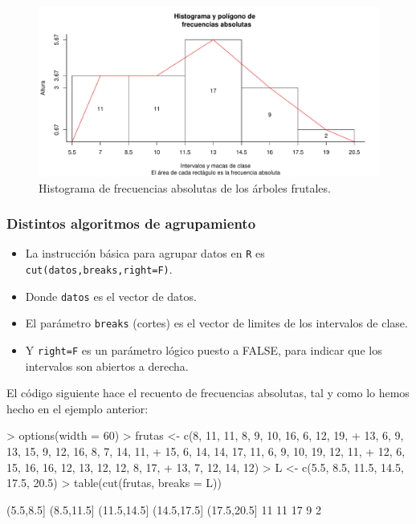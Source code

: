 \begin{frame}
\begin{figure}
\begin{center}


\includegraphics{./dibujos/01/-007}
\end{center}
 \caption{Histograma de frecuencias absolutas de los árboles frutales.} \label{EXEMPLE2}
\end{figure}
\label{PUNTUACIONS}
\end{frame}

\begin{frame}[fragile]
\frametitle{Distintos algoritmos de agrupamiento}
\begin{itemize}
\item La instrucción básica para agrupar datos en \texttt{R} es \texttt{cut(datos,breaks,right=F)}.
\item  Donde \texttt{datos} es el vector de datos.
\item El parámetro \texttt{breaks} (cortes) es el vector de limites de los intervalos de clase.
\item Y  \texttt{right=F} es un parámetro lógico puesto a FALSE, para indicar que los intervalos son abiertos a derecha.
\end{itemize}
\end{frame}

\begin{frame}[fragile]
El código siguiente hace el recuento de frecuencias absolutas, tal y como lo hemos hecho en el ejemplo anterior:
\begin{Schunk}
\begin{Sinput}
> options(width = 60)
> frutas <- c(8, 11, 11, 8, 9, 10, 16, 6, 12, 19, 
+     13, 6, 9, 13, 15, 9, 12, 16, 8, 7, 14, 11, 
+     15, 6, 14, 14, 17, 11, 6, 9, 10, 19, 12, 11, 
+     12, 6, 15, 16, 16, 12, 13, 12, 12, 8, 17, 
+     13, 7, 12, 14, 12)
> L <- c(5.5, 8.5, 11.5, 14.5, 17.5, 20.5)
> table(cut(frutas, breaks = L))
\end{Sinput}
\begin{Soutput}
  (5.5,8.5]  (8.5,11.5] (11.5,14.5] (14.5,17.5] (17.5,20.5] 
         11          11          17           9           2 
\end{Soutput}
\end{Schunk}

\end{frame}

